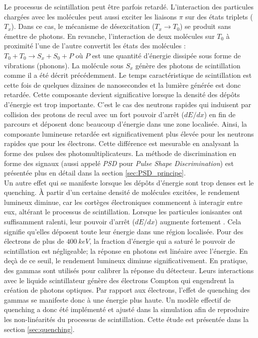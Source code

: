 Le processus de scintillation peut être parfois retardé. L'interaction des particules chargées avec les molécules peut aussi exciter les liaisons $\pi$ sur des états triplets ($T_x$). Dans ce cas, le mécanisme de désexcitation ($T_x \rightarrow T_0$) se produit sans émettre de photons. En revanche, l'interaction de deux molécules sur $T_0$ à proximité l'une de l'autre convertit les états des molécules : $T_0 + T_0 \rightarrow S_x + S_0 + P$ où $P$ est une quantité d'énergie dissipée sous forme de vibrations (phonons). La molécule sous $S_x$ génère des photons de scintillation comme il a été décrit précédemment. Le temps caractéristique de scintillation est cette fois de quelques dizaines de nanosecondes et la lumière générée est donc retardée. Cette composante devient significative lorsque la densité des dépôts d'énergie est trop importante. C'est le cas des neutrons rapides qui induisent par collision des protons de recul avec un fort pouvoir d'arrêt ($dE/dx$) en fin de parcours et déposent donc beaucoup d'énergie dans une zone localisée. Ainsi, la composante lumineuse retardée est significativement plus élevée pour les neutrons rapides que pour les électrons. Cette différence est mesurable en analysant la forme des pulses des photomultiplicateurs. La méthode de discrimination en forme des signaux (aussi appelé \textit{PSD} pour \textit{Pulse Shape Discrimination}) est présentée plus en détail dans la section \ref{sec:PSD_principe}.\\ 

Un autre effet qui se manifeste lorsque les dépôts d'énergie sont trop denses est le quenching. À partir d'un certaine densité de molécules excitées, le rendement lumineux diminue, car les cortèges électroniques commencent à interagir entre eux, altérant le processus de scintillation. Lorsque les particules ionisantes ont suffisamment ralenti, leur pouvoir d'arrêt ($dE/dx$) augmente fortement \cite{PDG_particle_matter_2018}. Cela signifie qu'elles déposent toute leur énergie dans une région localisée. Pour des électrons de plus de $\SI{400}{keV}$, la fraction d'énergie qui a saturé le pouvoir de scintillation est négligeable; la réponse en photons est linéaire avec l'énergie. En deçà de ce seuil, le rendement lumineux diminue significativement. En pratique, des gammas sont utilisés pour calibrer la réponse du détecteur. Leurs interactions avec le liquide scintillateur génère des électrons Compton qui engendrent la création de photons optiques. Par rapport aux électrons, l'effet de quenching des gammas se manifeste donc à une énergie plus haute. Un modèle effectif de quenching a donc été implémenté et ajusté dans la simulation afin de reproduire les non-linéarités du processus de scintillation. Cette étude est présentée dans la section \ref{sec:quenching}.\\ 


